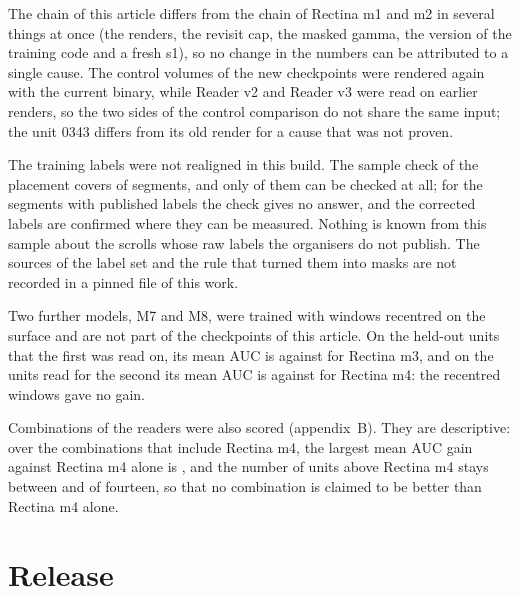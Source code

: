 The chain of this article differs from the chain of Rectina m1 and m2 in several things at once (the renders, the revisit cap, the masked gamma, the version of the training code and a fresh s1), so no change in the numbers can be attributed to a single cause. The control volumes of the new checkpoints were rendered again with the current binary, while Reader v2 and Reader v3 were read on earlier renders, so the two sides of the control comparison do not share the same input; the unit 0343 differs from its old render for a cause that was not proven.

The training labels were not realigned in this build. The sample check of the placement covers \CheckSample{} of \TrainSegN{} segments, and only \CheckN{} of them can be checked at all; for the \LabPublished{} segments with published labels the check gives no answer, and the corrected labels are confirmed where they can be measured. Nothing is known from this sample about the scrolls whose raw labels the organisers do not publish. The sources of the label set and the rule that turned them into masks are not recorded in a pinned file of this work.

Two further models, M7 and M8, were trained with windows recentred on the surface and are not part of the checkpoints of this article. On the \NegSevenN{} held-out units that the first was read on, its mean AUC is \NegSevenAuc{} against \NegSevenRefAuc{} for Rectina m3, and on the \NegEightN{} units read for the second its mean AUC is \NegEightAuc{} against \NegEightRefAuc{} for Rectina m4: the recentred windows gave no gain.

Combinations of the readers were also scored (appendix~B). They are descriptive: over the \PairRows{} combinations that include Rectina m4, the largest mean AUC gain against Rectina m4 alone is \PairMaxGain{}, and the number of units above Rectina m4 stays between \PairMinWins{} and \PairMaxWins{} of fourteen, so that no combination is claimed to be better than Rectina m4 alone.

\section{Release}

